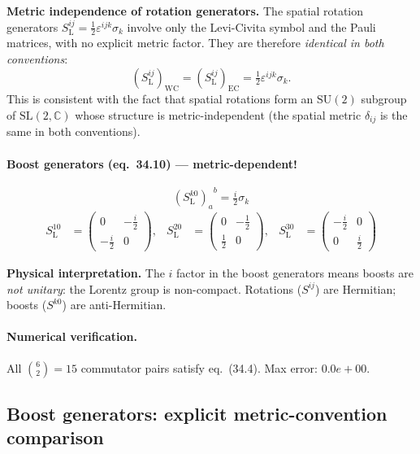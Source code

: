 \documentclass[12pt]{article}
\newcommand{\verified}[1]{\textcolor{verifygreen}{\checkmark\; #1}}
\begin{document}
\noindent\textbf{Metric independence of rotation generators.}
The spatial rotation generators $S^{ij}_{\mathrm{L}} = \tfrac{1}{2}\varepsilon^{ijk}\sigma_k$
involve only the Levi-Civita symbol and the Pauli matrices, with no explicit
metric factor. They are therefore \emph{identical in both conventions}:
\[
  (S^{ij}_{\mathrm{L}})_{\mathrm{WC}} = (S^{ij}_{\mathrm{L}})_{\mathrm{EC}}
  = \tfrac{1}{2}\varepsilon^{ijk}\sigma_k.
\]
This is consistent with the fact that spatial rotations form an $\mathrm{SU}(2)$
subgroup of $\mathrm{SL}(2,\mathbb{C})$ whose structure is
metric-independent (the spatial metric $\delta_{ij}$ is the same in both conventions).

\paragraph{Boost generators (eq.~34.10) --- metric-dependent!}
\begin{equation}
  {(S^{k0}_{\mathrm{L}})_a}^b = \tfrac{i}{2}\sigma_k
  \tag{34.10}
\end{equation}
\begin{align*}
  S^{10}_{\mathrm{L}} &= \begin{pmatrix}0 & -\tfrac{i}{2} \\ -\tfrac{i}{2} & 0\end{pmatrix},&
  S^{20}_{\mathrm{L}} &= \begin{pmatrix}0 & -\tfrac{1}{2} \\ \tfrac{1}{2} & 0\end{pmatrix},&
  S^{30}_{\mathrm{L}} &= \begin{pmatrix}-\tfrac{i}{2} & 0 \\ 0 & \tfrac{i}{2}\end{pmatrix}
\end{align*}

\noindent\textbf{Physical interpretation.}
The $i$ factor in the boost generators means boosts are \emph{not unitary}:
the Lorentz group is non-compact.  Rotations ($S^{ij}$) are Hermitian;
boosts ($S^{k0}$) are anti-Hermitian.

\paragraph{Numerical verification.}
\verified{All $\binom{6}{2} = 15$ commutator pairs satisfy eq.~(34.4). Max error: $0.0e+00$.}

\subsection{Boost generators: explicit metric-convention comparison}
\end{document}
